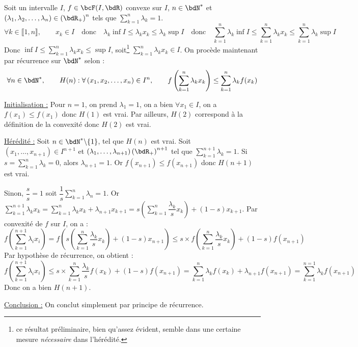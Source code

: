 \documentclass[a4paper,french,bookmarks]{report}
\begin{document}
\begin{nproof}
    Soit un intervalle $I$, $f \in \bcF(I, \bdR)$ convexe sur $I$, $n \in \bdN^*$ et $\left(\lambda_1, \lambda_2, \dots, \lambda_n\right) \in \left(\bdR_+\right)^n$ tels que $\displaystyle \sum_{k=1}^n \lambda_k = 1$.
    \[\forall k \in \llbracket 1, n\rrbracket,\qquad x_k \in I \quad \text{donc} \quad \lambda_k\inf I \leq \lambda_kx_k \leq \lambda_k \sup I \quad \text{donc} \quad \sum_{k=1}^n \lambda_k \inf I \leq \sum_{k=1}^n \lambda_kx_k \leq \sum_{k=1}^n \lambda_k \sup I\]
    Donc $\displaystyle \inf I \leq \sum_{k=1}^n \lambda_kx_k \leq \sup I$, soit\footnote{ce résultat préliminaire, bien qu'assez évident, semble dans une certaine mesure \textit{nécessaire} dans l'hérédité.} $\displaystyle \sum_{k=1}^n \lambda_kx_k \in I$. On procède maintenant par récurrence sur $\bdN^*$ selon :
    \[ \forall n \in \bdN^*,\qquad H(n) : \forall \left(x_1, x_2, \dots, x_n\right) \in I^n,\qquad f\left(\sum_{k=1}^n \lambda_kx_k\right) \leq \sum_{k=1}^n \lambda_kf(x_k)\]
    \begin{enumerate}
        \itt \underline{Initialisation :} Pour $n=1$, on prend $\lambda_1 = 1$, on a bien $\forall x_1 \in I$, on a $f(x_1) \leq f(x_1)$ donc $H(1)$ est vrai. Par ailleurs, $H(2)$ correspond à la définition de la convexité donc $H(2)$ est vrai.
            
        \itt \underline{Hérédité :} Soit $n \in \bdN^* \backslash \{ 1 \}$, tel que $H(n)$ est vrai. Soit $\left(x_1, \dots, x_{n+1}\right) \in I^{n+1}$ et $\left(\lambda_1, \dots, \lambda_{n+1}\right) \left(\bdR_+\right)^{n+1}$ tel que $\displaystyle\sum_{k=1}^{n+1} \lambda_k = 1$. Si $s = \displaystyle\sum_{k=1}^n \lambda_k = 0$, alors $\lambda_{n+1} = 1$. Or  $f(x_{n+1}) \leq f(x_{n+1})$ donc $H(n+1)$ est vrai.
            
        Sinon, $\dfrac{s}{s} = 1$ soit $\dfrac{1}{s}\displaystyle\sum_{k=1}^n \lambda_n = 1$. Or $\displaystyle \sum_{k=1}^{n+1} \lambda_kx_k = \sum_{k=1}^{n} \lambda_kx_k + \lambda_{n+1}x_{k+1} = s\left(\sum_{k=1}^{n} \dfrac{\lambda_k}{s}x_k\right) + (1-s)x_{k+1}$. Par convexité de $f$ sur $I$, on a :
        \[ f\left(\sum_{k=1}^{n+1} \lambda_ix_i\right) = f\left( s\left(\sum_{k=1}^{n} \dfrac{\lambda_k}{s}x_k\right) + (1-s)x_{n+1}\right) \leq s\times f\left(\sum_{k=1}^n \dfrac{\lambda_k}{s}x_k\right) + (1-s)f(x_{n+1})\]
        Par hypothèse de récurrence, on obtient :
        \[ f\left(\sum_{k=1}^{n+1} \lambda_ix_i\right) \leq s\times \sum_{k=1}^n \dfrac{\lambda_k}{s}f\left(x_k\right) + (1-s)f(x_{n+1}) = \sum_{k=1}^n \lambda_kf(x_k) + \lambda_{n+1}f(x_{n+1}) = \sum_{k=1}^{n=1}\lambda_kf(x_{n+1})\]
        Donc on a bien $H(n+1)$.
            
        \itt \underline{Conclusion :} On conclut simplement par principe de récurrence.
    \end{enumerate}
\end{nproof}
\end{document}
